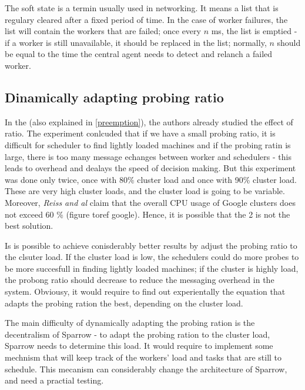 \documentclass[11pt]{article}
\begin{document}
		The soft state is a termin usually used in networking. It means a list that is regulary cleared after a fixed period of time. In the case of worker failures, the list will contain the workers that are failed; once every $n$ ms, the list is emptied - if a worker is still unavailable, it should be replaced in the list; normally, $n$ should be equal to the time the central agent needs to detect and relanch a failed worker.
	
	\subsection{Dinamically adapting probing ratio}
	
		In the \cite[subsection 7.9]{sparrow} (also explained in \ref{preemption}), the authors already studied the effect of ratio. The experiment conlcuded that if we have a small probing ratio, it is difficult for scheduler to find lightly loaded machines and if the probing ratin is large, there is too many message echanges between worker and schedulers - this leads to overhead and dealays the speed of decision making. But this experiment was done only twice, once with 80\% cluster load and once with 90\% cluster load. These are very high cluster loads, and the cluster load is going to be variable. Moreover, \textit{Reiss and al} \cite{hetero} claim that the overall CPU usage of Google clusters does not exceed 60 \% (figure toref google). Hence, it is possible that the 2 is not the best solution.
		
		Is is possible to achieve conisderably better results by adjust the probing ratio to the clsuter load. If the cluster load is low, the schedulers could do more probes to be more succesfull in finding lightly loaded machines; if the cluster is highly load, the probong ratio should decrease to reduce the messaging overhead in the system. Obviousy, it would require to find out experientally the equation that adapts the probing ration the best, depending on the cluster load.
		
		The main difficulty of dynamically adapting the probing ration is the decentralism of Sparrow - to adapt the probing ration to the cluster load, Sparrow needs to determine this load. It would require to implement some mechnism that will keep track of the workers' load and tasks that are still to schedule. This mecanism can considerably change the architecture of Sparrow, and need a practial testing.
		
\end{document}
